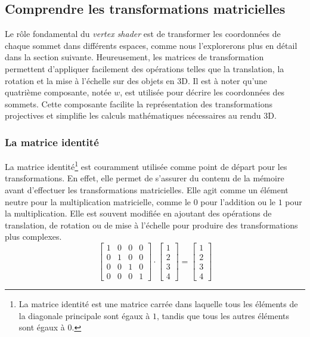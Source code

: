 \subsection*{Comprendre les transformations matricielles}

Le rôle fondamental du \textit{vertex shader} est de transformer les coordonnées de chaque sommet dans différents espaces, comme nous l'explorerons plus en détail dans la section suivante. Heureusement, les matrices de transformation permettent d'appliquer facilement des opérations telles que la translation, la rotation et la mise à l'échelle sur des objets en 3D. Il est à noter qu'une quatrième composante, notée $w$, est utilisée pour décrire les coordonnées des sommets. Cette composante facilite la représentation des transformations projectives et simplifie les calculs mathématiques nécessaires au rendu 3D.

\subsubsection*{La matrice identité}
La matrice identité\footnote{La matrice identité est une matrice carrée dans laquelle tous les éléments de la diagonale principale sont égaux à $1$, tandis que tous les autres éléments sont égaux à $0$.} est couramment utilisée comme point de départ pour les transformations. En effet, elle permet de s'assurer du contenu de la mémoire avant d'effectuer les transformations matricielles. Elle agit comme un élément neutre pour la multiplication matricielle, comme le $0$ pour l'addition ou le $1$ pour la multiplication. Elle est souvent modifiée en ajoutant des opérations de translation, de rotation ou de mise à l'échelle pour produire des transformations plus complexes.
\[
\begin{bmatrix}
1 & 0 & 0 & 0\\
0 & 1 & 0 & 0\\
0 & 0 & 1 & 0\\
0 & 0 & 0 & 1
\end{bmatrix}
\cdot
\begin{bmatrix}
1\\
2\\
3\\
4
\end{bmatrix}
=
\begin{bmatrix}
1\\
2\\
3\\
4
\end{bmatrix}
\]

